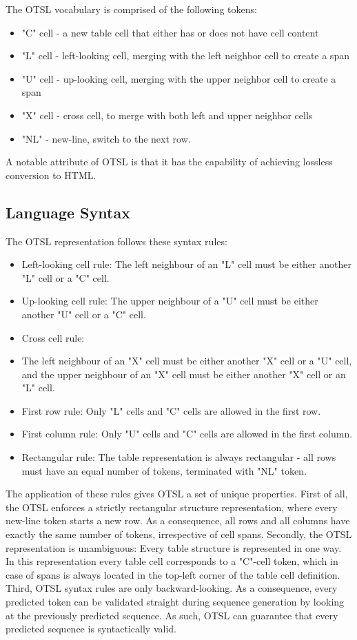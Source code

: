 \documentclass[11pt,a4paper]{article}
\begin{document}
The OTSL vocabulary is comprised of the following tokens:

\begin{itemize}
\item "C" cell - a new table cell that either has or does not have cell content
\item "L" cell - left-looking cell, merging with the left neighbor cell to create a span
\item "U" cell - up-looking cell, merging with the upper neighbor cell to create a span
\item "X" cell - cross cell, to merge with both left and upper neighbor cells
\item "NL" - new-line, switch to the next row.
\end{itemize}

A notable attribute of OTSL is that it has the capability of achieving lossless conversion to HTML.

\subsection{Language Syntax}

The OTSL representation follows these syntax rules:

\begin{itemize}
\item Left-looking cell rule: 
The left neighbour of an "L" cell must be either another "L" cell or a "C" cell.
\item Up-looking cell rule:
The upper neighbour of a "U" cell must be either another "U" cell or a "C" cell.
\item Cross cell rule:
\item The left neighbour of an "X" cell must be either another "X" cell or a "U" cell, and the upper neighbour of an "X" cell must be either another "X" cell or an "L" cell.
\item First row rule:
Only "L" cells and "C" cells are allowed in the first row.
\item First column rule:
Only "U" cells and "C" cells are allowed in the first column.
\item Rectangular rule:
The table representation is always rectangular - all rows must have an equal number of tokens, terminated with "NL" token.
\end{itemize}

The application of these rules gives OTSL a set of unique properties.
First of all, the OTSL enforces a strictly rectangular structure representation, where every new-line token starts a new row. As a consequence, all rows and all columns have exactly the same number of tokens, irrespective of cell spans.
Secondly, the OTSL representation is unambiguous: Every table structure is represented in one way. In this representation every table cell corresponds to a "C"-cell token, which in case of spans is always located in the top-left corner of the table cell definition.
Third, OTSL syntax rules are only backward-looking. As a consequence, every predicted token can be validated straight during sequence generation by looking at the previously predicted sequence. As such, OTSL can guarantee that every predicted sequence is syntactically valid.
\end{document}
